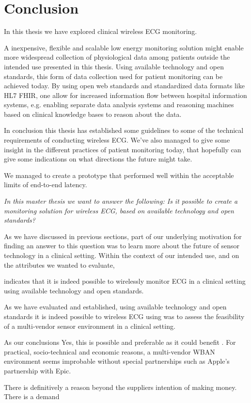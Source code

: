 \section{Conclusion} %
\label{sec:conclusion}

In this thesis we have explored clinical wireless ECG monitoring.


A inexpensive, flexible and scalable low energy monitoring solution might enable more widespread collection of physiological data among patients outside the intended use presented in this thesis. Using available technology and open standards, this form of data collection used for patient monitoring can be achieved today. By using open web standards and standardized data formats like HL7 FHIR, one allow for increased information flow between hospital information systems, e.g. enabling separate data analysis systems and reasoning machines based on clinical knowledge bases to reason about the data.

In conclusion this thesis has established some guidelines to some of the technical requirements of conducting wireless ECG. We've also managed to give some insight in the different practices of patient monitoring today, that hopefully can give some indications on what directions the future might take.

We managed to create a prototype that performed well within the acceptable limits of end-to-end latency.

\textit{In this master thesis we want to answer the following: Is it possible to create a monitoring solution for wireless ECG, based on available technology and open standards?}

As we have discussed in previous sections, part of our underlying motivation for finding an answer to this question was to learn more about the future of sensor technology in a clinical setting. Within the context of our intended use, and on the attributes we wanted to evaluate,

indicates that it is indeed possible to wirelessly monitor ECG in a clinical setting using available technology and open standards.

As we have evaluated and established, using available technology and open standards it is indeed possible  to wireless  ECG using
 was to assess the feasibility of a multi-vendor sensor environment in a clinical setting.


As our conclusions Yes, this is possible and preferable as it could benefit . For practical, socio-technical and economic reasons, a multi-vendor WBAN environment seems improbable without special partnerships such as Apple's partnership with Epic. 

There is definitively a reason beyond the suppliers intention of making money. There is a demand 



